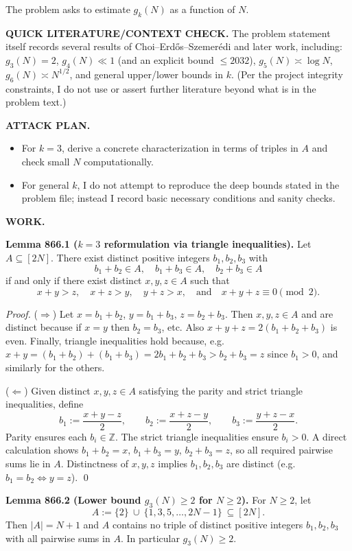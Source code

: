The problem asks to estimate $g_k(N)$ as a function of $N$.

\medskip
\noindent\textbf{QUICK LITERATURE/CONTEXT CHECK.}
The problem statement itself records several results of Choi--Erd\H{o}s--Szemer\'edi and later work, including:
$g_3(N)=2$, $g_4(N)\ll 1$ (and an explicit bound $\le 2032$),
$g_5(N)\asymp\log N$, $g_6(N)\asymp N^{1/2}$,
and general upper/lower bounds in $k$.
(Per the project integrity constraints, I do not use or assert further literature beyond what is in the problem text.)

\medskip
\noindent\textbf{ATTACK PLAN.}
\begin{itemize}
\item For $k=3$, derive a concrete characterization in terms of triples in $A$ and check small $N$ computationally.
\item For general $k$, I do not attempt to reproduce the deep bounds stated in the problem file; instead I record basic necessary conditions and sanity checks.
\end{itemize}

\medskip
\noindent\textbf{WORK.}

\medskip
\noindent\textbf{Lemma 866.1 ($k=3$ reformulation via triangle inequalities).}
Let $A\subseteq[2N]$. There exist distinct positive integers $b_1,b_2,b_3$ with
\[
 b_1+b_2\in A,\quad b_1+b_3\in A,\quad b_2+b_3\in A
\]
if and only if there exist distinct $x,y,z\in A$ such that
\[
 x+y>z,\quad x+z>y,\quad y+z>x,\quad\text{and}\quad x+y+z\equiv 0\pmod 2.
\]

\smallskip
\noindent\emph{Proof.}
($\Rightarrow$) Let $x=b_1+b_2$, $y=b_1+b_3$, $z=b_2+b_3$.
Then $x,y,z\in A$ and are distinct because if $x=y$ then $b_2=b_3$, etc.
Also $x+y+z=2(b_1+b_2+b_3)$ is even.
Finally, triangle inequalities hold because, e.g.
$x+y=(b_1+b_2)+(b_1+b_3)=2b_1+b_2+b_3> b_2+b_3=z$ since $b_1>0$, and similarly for the others.

($\Leftarrow$) Given distinct $x,y,z\in A$ satisfying the parity and strict triangle inequalities, define
\[
 b_1:=\frac{x+y-z}{2},\qquad b_2:=\frac{x+z-y}{2},\qquad b_3:=\frac{y+z-x}{2}.
\]
Parity ensures each $b_i\in\mathbb{Z}$. The strict triangle inequalities ensure $b_i>0$.
A direct calculation shows $b_1+b_2=x$, $b_1+b_3=y$, $b_2+b_3=z$, so all required pairwise sums lie in $A$.
Distinctness of $x,y,z$ implies $b_1,b_2,b_3$ are distinct (e.g. $b_1=b_2\iff y=z$).
\qed

\medskip
\noindent\textbf{Lemma 866.2 (Lower bound $g_3(N)\ge 2$ for $N\ge 2$).}
For $N\ge 2$, let
\[
A:=\{2\}\ \cup\ \{1,3,5,\dots,2N-1\}\ \subseteq [2N].
\]
Then $|A|=N+1$ and $A$ contains no triple of distinct positive integers $b_1,b_2,b_3$ with all pairwise sums in $A$.
In particular $g_3(N)\ge 2$.

